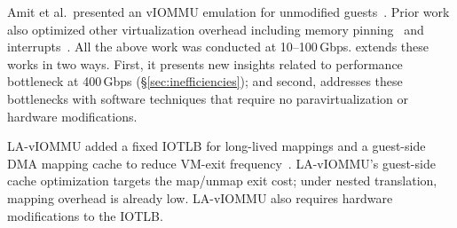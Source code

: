 
Amit et al.\ presented an vIOMMU emulation for
    unmodified guests~\cite{Amit2011vIOMMU}. Prior work also optimized other virtualization overhead including 
    memory pinning~\cite{Tian2020coIOMMU} and interrupts~\cite{Gordon2012eli, Har2013paraIO}. All the above work was conducted at 10--100\,Gbps. \brand extends these works in two ways. First, it presents new insights related to performance bottleneck at 400\,Gbps (\S\ref{sec:inefficiencies}); and second, {\name} addresses these bottlenecks with software techniques that require no paravirtualization or hardware modifications.


LA-vIOMMU added a fixed IOTLB for long-lived mappings and a guest-side DMA mapping cache 
    to reduce VM-exit frequency~\cite{Lv2022LAvIOMMU}.
LA-vIOMMU's guest-side cache optimization targets the map/unmap exit cost; 
    under nested translation, mapping overhead is already low. 
LA-vIOMMU also requires hardware modifications to the IOTLB.
\fi 



